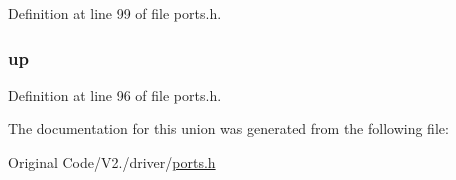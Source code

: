 \-Definition at line 99 of file ports.\-h.

\hypertarget{unions__button__flags_af8b4ed22215bcf4c202e7024db0a7342}{
\subsubsection[{up}]{ {\bf up}}}\label{unions__button__flags_af8b4ed22215bcf4c202e7024db0a7342}


\-Definition at line 96 of file ports.\-h.



\-The documentation for this union was generated from the following file\-:\begin{DoxyCompactItemize}
\item 
\-Original Code/\-V2./driver/\hyperlink{ports_8h}{ports.\-h}\end{DoxyCompactItemize}
